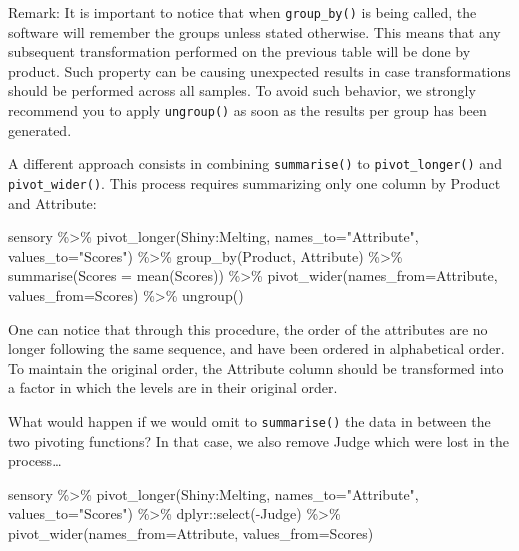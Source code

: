 \documentclass[
]{book}
\newenvironment{Shaded}{\begin{snugshade}}{\end{snugshade}}
\newcommand{\AttributeTok}[1]{\textcolor[rgb]{0.77,0.63,0.00}{#1}}
\newcommand{\FunctionTok}[1]{\textcolor[rgb]{0.00,0.00,0.00}{#1}}
\newcommand{\NormalTok}[1]{#1}
\newcommand{\SpecialCharTok}[1]{\textcolor[rgb]{0.00,0.00,0.00}{#1}}
\newcommand{\StringTok}[1]{\textcolor[rgb]{0.31,0.60,0.02}{#1}}
\begin{document}
Remark: It is important to notice that when \texttt{group\_by()} is being called, the software will remember the groups unless stated otherwise. This means that any subsequent transformation performed on the previous table will be done by product. Such property can be causing unexpected results in case transformations should be performed across all samples. To avoid such behavior, we strongly recommend you to apply \texttt{ungroup()} as soon as the results per group has been generated.

A different approach consists in combining \texttt{summarise()} to \texttt{pivot\_longer()} and \texttt{pivot\_wider()}. This process requires summarizing only one column by Product and Attribute:

\begin{Shaded}
\begin{Highlighting}[]
\NormalTok{sensory }\SpecialCharTok{\%\textgreater{}\%} 
  \FunctionTok{pivot\_longer}\NormalTok{(Shiny}\SpecialCharTok{:}\NormalTok{Melting, }\AttributeTok{names\_to=}\StringTok{"Attribute"}\NormalTok{, }\AttributeTok{values\_to=}\StringTok{"Scores"}\NormalTok{) }\SpecialCharTok{\%\textgreater{}\%} 
  \FunctionTok{group\_by}\NormalTok{(Product, Attribute) }\SpecialCharTok{\%\textgreater{}\%} 
  \FunctionTok{summarise}\NormalTok{(}\AttributeTok{Scores =} \FunctionTok{mean}\NormalTok{(Scores)) }\SpecialCharTok{\%\textgreater{}\%} 
  \FunctionTok{pivot\_wider}\NormalTok{(}\AttributeTok{names\_from=}\NormalTok{Attribute, }\AttributeTok{values\_from=}\NormalTok{Scores) }\SpecialCharTok{\%\textgreater{}\%} 
  \FunctionTok{ungroup}\NormalTok{()}
\end{Highlighting}
\end{Shaded}

One can notice that through this procedure, the order of the attributes are no longer following the same sequence, and have been ordered in alphabetical order. To maintain the original order, the Attribute column should be transformed into a factor in which the levels are in their original order.

What would happen if we would omit to \texttt{summarise()} the data in between the two pivoting functions? In that case, we also remove Judge which were lost in the process\ldots{}

\begin{Shaded}
\begin{Highlighting}[]
\NormalTok{sensory }\SpecialCharTok{\%\textgreater{}\%} 
  \FunctionTok{pivot\_longer}\NormalTok{(Shiny}\SpecialCharTok{:}\NormalTok{Melting, }\AttributeTok{names\_to=}\StringTok{"Attribute"}\NormalTok{, }\AttributeTok{values\_to=}\StringTok{"Scores"}\NormalTok{) }\SpecialCharTok{\%\textgreater{}\%} 
\NormalTok{  dplyr}\SpecialCharTok{::}\FunctionTok{select}\NormalTok{(}\SpecialCharTok{{-}}\NormalTok{Judge) }\SpecialCharTok{\%\textgreater{}\%} 
  \FunctionTok{pivot\_wider}\NormalTok{(}\AttributeTok{names\_from=}\NormalTok{Attribute, }\AttributeTok{values\_from=}\NormalTok{Scores)}
\end{Highlighting}
\end{Shaded}
\end{document}
